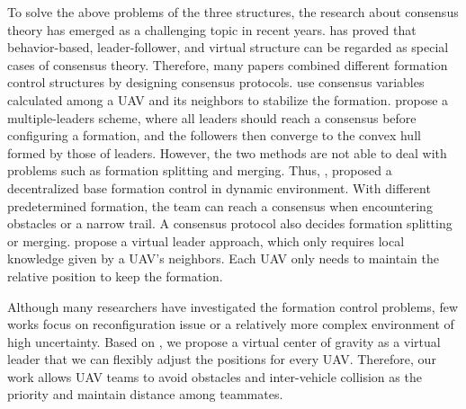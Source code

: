 To solve the above problems of the three structures, the research about consensus theory has emerged as a challenging topic in recent years. \citet{ren2007consensus} has proved that behavior-based, leader-follower, and virtual structure can be regarded as special cases of consensus theory. Therefore, many papers combined different formation control structures by designing consensus protocols. \citet{7419717} use consensus variables calculated among a UAV and its neighbors to stabilize the formation. \citet{8295262} propose a multiple-leaders scheme, where all leaders should reach a consensus before configuring a formation, and the followers then converge to the convex hull formed by those of leaders. However, the two methods are not able to deal with problems such as formation splitting and merging. Thus, \citet{7487747}, \citet{8793765} proposed a decentralized base formation control in dynamic environment. With different predetermined formation, the team can reach a consensus when encountering obstacles or a narrow trail. A consensus protocol also decides formation splitting or merging. \citet{5069925} propose a virtual leader approach, which only requires local knowledge given by a UAV's neighbors. Each UAV only needs to maintain the relative position to keep the formation.

Although many researchers have investigated the formation control problems, few works focus on reconfiguration issue or a relatively more complex environment of high uncertainty. Based on \citep{5069925}, we propose a virtual center of gravity as a virtual leader that we can flexibly adjust the positions for every UAV. Therefore, our work allows UAV teams to avoid obstacles and inter-vehicle collision as the priority and maintain distance among teammates.
